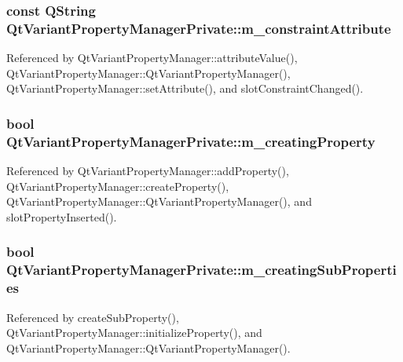 \subsubsection[{m\+\_\+constraint\+Attribute}]{\setlength{\rightskip}{0pt plus 5cm}const Q\+String Qt\+Variant\+Property\+Manager\+Private\+::m\+\_\+constraint\+Attribute}\label{classQtVariantPropertyManagerPrivate_ae470858aeff321179122b531f84da3c5}


Referenced by Qt\+Variant\+Property\+Manager\+::attribute\+Value(), Qt\+Variant\+Property\+Manager\+::\+Qt\+Variant\+Property\+Manager(), Qt\+Variant\+Property\+Manager\+::set\+Attribute(), and slot\+Constraint\+Changed().

\subsubsection[{m\+\_\+creating\+Property}]{\setlength{\rightskip}{0pt plus 5cm}bool Qt\+Variant\+Property\+Manager\+Private\+::m\+\_\+creating\+Property}\label{classQtVariantPropertyManagerPrivate_aca60361c7a51ce554aeed0cc24648d32}


Referenced by Qt\+Variant\+Property\+Manager\+::add\+Property(), Qt\+Variant\+Property\+Manager\+::create\+Property(), Qt\+Variant\+Property\+Manager\+::\+Qt\+Variant\+Property\+Manager(), and slot\+Property\+Inserted().

\subsubsection[{m\+\_\+creating\+Sub\+Properties}]{\setlength{\rightskip}{0pt plus 5cm}bool Qt\+Variant\+Property\+Manager\+Private\+::m\+\_\+creating\+Sub\+Properties}\label{classQtVariantPropertyManagerPrivate_ad263e871dcbc4ca34202bd498c1723d5}


Referenced by create\+Sub\+Property(), Qt\+Variant\+Property\+Manager\+::initialize\+Property(), and Qt\+Variant\+Property\+Manager\+::\+Qt\+Variant\+Property\+Manager().

